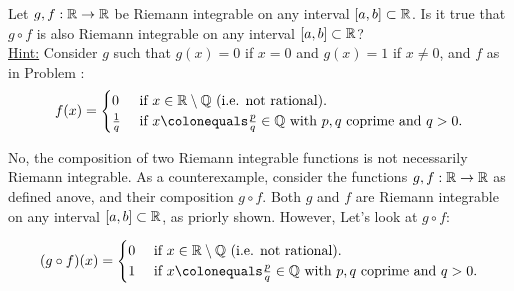 \begin{problem}
  Let $g, f : \mathbb{R} \to \mathbb{R}$ be Riemann integrable on any interval $[a, b] \subset \mathbb{R}$.
  Is it true that $g \circ f$ is also Riemann integrable on any interval $[a, b] \subset \mathbb{R}$?\\
  \underline{Hint:} Consider $g$ such that $g(x) = 0$ if $x = 0$
  and $g(x) = 1$ if $x \neq 0$, and $f$ as in Problem :
  \[
    f(x) = \begin{cases}
      0 & \text{ if } x \in \R \setminus \Q \text{ (i.e. not rational).}\\
      \frac{1}{q} & \text{ if } x \colonequals \frac{p}{q} \in \Q
      \text{ with $p, q$ coprime and $q > 0$}.
    \end{cases}
  \]
\end{problem}

\begin{answer}
  No, the composition of two Riemann integrable functions is not necessarily Riemann integrable.
  As a counterexample, consider the functions $g, f : \mathbb{R} \to \mathbb{R}$ as defined anove,
  and their composition $g \circ f$.
  Both $g$ and $f$ are Riemann integrable on any interval $[a, b] \subset \mathbb{R}$,
  as priorly shown. However, Let's look at $g \circ f$:

  \[
    (g \circ f)(x) = \begin{cases}
      0 & \text{ if } x \in \R \setminus \Q \text{ (i.e. not rational).}\\
      1 & \text{ if } x \colonequals \frac{p}{q} \in \Q
      \text{ with $p, q$ coprime and $q > 0$}.
    \end{cases}
  \]



\end{answer}
